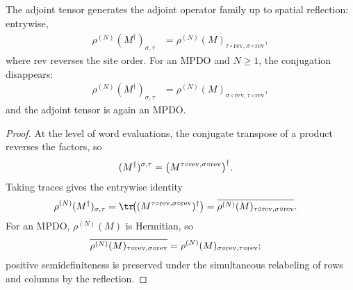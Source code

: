 \begin{lemma}
    \label{thm:mpo_adjoint_reflection}
    \leanok
    The adjoint tensor generates the adjoint operator family up to spatial
    reflection: entrywise,
    \begin{align}
        \rho^{(N)}(M^\dagger)_{\sigma,\tau}
         & =
        \overline{
            \rho^{(N)}(M)_{\tau\circ\mathrm{rev},
                    \sigma\circ\mathrm{rev}}
        },
        \label{eq:mpdo_coeff_adjoint_reflection}
    \end{align}
    where $\mathrm{rev}$ reverses the site order. For an MPDO and $N\geq1$,
    the conjugation disappears:
    \begin{align}
        \rho^{(N)}(M^\dagger)_{\sigma,\tau}
         & =
        \rho^{(N)}(M)_{\sigma\circ\mathrm{rev},
                \tau\circ\mathrm{rev}},
        \label{eq:mpdo_adjoint_mpdo}
    \end{align}
    and the adjoint tensor is again an MPDO.
\end{lemma}

\begin{proof}
    \leanok
    At the level of word evaluations, the conjugate transpose of a product
    reverses the factors, so
    \begin{align}
        (M^\dagger)^{\sigma,\tau}
         & =
        \bigl(        M^{\tau\circ\mathrm{rev},
            \sigma\circ\mathrm{rev}}
        \bigr)^\dagger.
        \notag
    \end{align}
    Taking traces gives the entrywise identity
    \begin{align}
        \rho^{(N)}(M^\dagger)_{\sigma,\tau}
         & =
        \tr\!\bigl(        (M^{\tau\circ\mathrm{rev},
                \sigma\circ\mathrm{rev}})^\dagger
        \bigr)
        =
        \overline{
            \rho^{(N)}(M)_{\tau\circ\mathrm{rev},
                    \sigma\circ\mathrm{rev}}
        }.
        \notag
    \end{align}
    For an MPDO, $\rho^{(N)}(M)$ is Hermitian, so
    \begin{align}
        \overline{
            \rho^{(N)}(M)_{\tau\circ\mathrm{rev},
                    \sigma\circ\mathrm{rev}}
        }
         & =
        \rho^{(N)}(M)_{\sigma\circ\mathrm{rev},
                \tau\circ\mathrm{rev}};
        \notag
    \end{align}
    positive semidefiniteness is preserved under the simultaneous relabeling
    of rows and columns by the reflection.
\end{proof}

